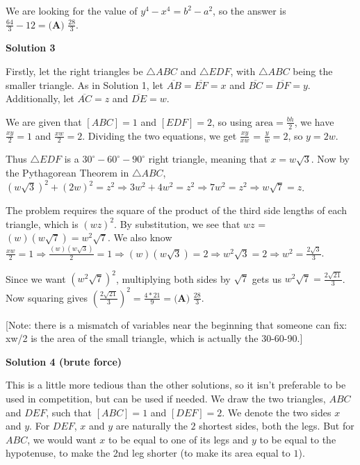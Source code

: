 \begin{enumerate}
 We are looking for the value of $y^4 - x^4 = b^2 - a^2$, so the answer is $\frac{64}{3} - 12 = \boxed{\textbf{(A) }\frac{28}{3}}$.

 



\textbf{Solution 3}

Firstly, let the right triangles be $\triangle ABC$ and $\triangle EDF$, with $\triangle ABC$ being the smaller triangle. As in Solution 1, let $\overline{AB} = \overline{EF} = x$ and $\overline{BC} = \overline{DF} = y$. Additionally, let $\overline{AC} = z$ and $\overline{DE} = w$.

 We are given that $[ABC] = 1$ and $[EDF] = 2$, so using $\text{area} = \frac{bh}{2}$, we have $\frac{xy}{2} = 1$ and $\frac{xw}{2} = 2$. Dividing the two equations, we get $\frac{xy}{xw}$ = $\frac{y}{w} = 2$, so $y = 2w$.

 Thus $\triangle EDF$ is a $30^{\circ}-60^{\circ}-90^{\circ}$ right triangle, meaning that $x = w\sqrt{3}$. Now by the Pythagorean Theorem in $\triangle ABC$, $\left(w\sqrt{3}\right)^2 + \left(2w\right)^2 = z^2 \Rightarrow 3w^2 + 4w^2 = z^2 \Rightarrow 7w^2 = z^2 \Rightarrow w\sqrt{7} = z$.

 The problem requires the square of the product of the third side lengths of each triangle, which is $(wz)^2$. By substitution, we see that $wz$ = $\left(w\right)\left(w\sqrt{7}\right) = w^2\sqrt{7}$. We also know $\frac{xw}{2} = 1 \Rightarrow\frac{(w)\left(w\sqrt{3}\right)}{2} =1 \Rightarrow (w)\left(w\sqrt{3}\right) = 2 \Rightarrow w^2\sqrt{3} = 2 \Rightarrow w^2 = \frac{2\sqrt{3}}{3}$. 

 Since we want $\left(w^2\sqrt{7}\right)^2$, multiplying both sides by $\sqrt{7}$ gets us $w^2\sqrt{7} = \frac{2\sqrt{21}}{3}$. Now squaring gives $\left(\frac{2\sqrt{21}}{3}\right)^2 = \frac{4*21}{9} = \boxed{\textbf{(A) }\frac{28}{3}}$.

 [Note: there is a mismatch of variables near the beginning that someone can fix: xw/2 is the area of the small triangle, which is actually the 30-60-90.]

 



\textbf{Solution 4 (brute force)}

This is a little more tedious than the other solutions, so it isn't preferable to be used in competition, but can be used if needed. We draw the two triangles, $ABC$ and $DEF$, such that $[ABC] = 1$ and $[DEF] = 2$. We denote the two sides $x$ and $y$. For $DEF$, $x$ and $y$ are naturally the $2$ shortest sides, both the legs. But for $ABC$, we would want $x$ to be equal to one of its legs and $y$ to be equal to the hypotenuse, to make the 2nd leg shorter (to make its area equal to $1$). 


\end{enumerate}
